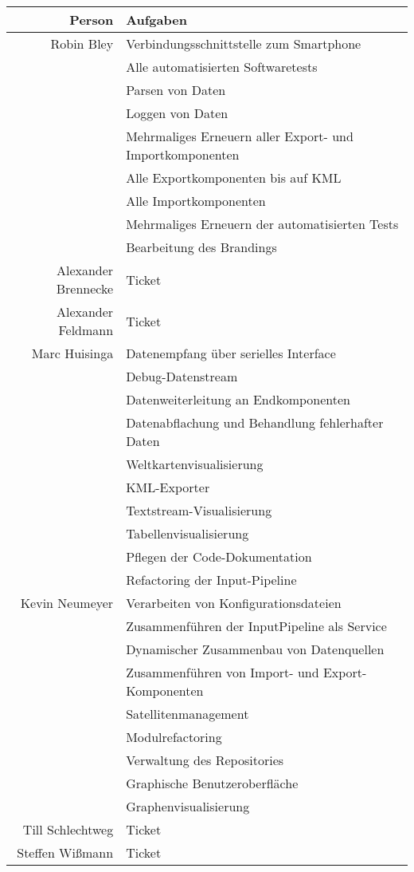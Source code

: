 \begin{table}[H]
	\centering
	\begin{tabular}{rl}
		\toprule
		\textbf{Person} & \textbf{Aufgaben} \\
		\midrule
		Robin Bley & Verbindungsschnittstelle zum Smartphone \\
		 & Alle automatisierten Softwaretests \\
		 & Parsen von Daten\\
		 & Loggen von Daten \\
		 & Mehrmaliges Erneuern aller Export- und Importkomponenten\\
		 & Alle Exportkomponenten bis auf KML \\
		 & Alle Importkomponenten\\
		 & Mehrmaliges Erneuern der automatisierten Tests\\
		 & Bearbeitung des Brandings\\
		Alexander Brennecke & Ticket \\
		Alexander Feldmann & Ticket \\
		Marc Huisinga & Datenempfang über serielles Interface \\
		 & Debug-Datenstream \\
		 & Datenweiterleitung an Endkomponenten \\
		 & Datenabflachung und Behandlung fehlerhafter Daten \\
		 & Weltkartenvisualisierung \\
		 & KML-Exporter \\
		 & Textstream-Visualisierung \\
		 & Tabellenvisualisierung \\
		 & Pflegen der Code-Dokumentation \\
		 & Refactoring der Input-Pipeline \\
		Kevin Neumeyer & Verarbeiten von Konfigurationsdateien \\
		 & Zusammenführen der InputPipeline als Service \\
		 & Dynamischer Zusammenbau von Datenquellen \\
		 & Zusammenführen von Import- und Export-Komponenten \\
		 & Satellitenmanagement \\
		 & Modulrefactoring \\
		 & Verwaltung des Repositories \\
		 & Graphische Benutzeroberfläche \\
		 & Graphenvisualisierung \\
		Till Schlechtweg & Ticket \\
		Steffen Wißmann & Ticket \\
		\bottomrule
	\end{tabular}
\end{table}

